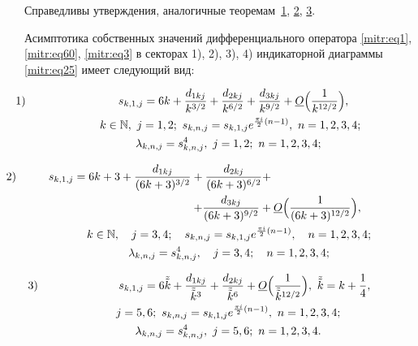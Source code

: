 Справедливы утверждения, аналогичные теоремам~\hyperlink{mitr:th1}{1}, \hyperlink{mitr:th2}{2}, \hyperlink{mitr:th3}{3}.



\smallskip



\begin{theorem}[4] Асимптотика собственных значений дифференциального оператора  {\rm \eqref{mitr:eq1}, \eqref{mitr:eq60}, \eqref{mitr:eq3}} в секторах  {\rm  1), 2), 3), 4)} индикаторной диаграммы \eqref{mitr:eq25} имеет следующий вид\/{\rm:}

\begin{gather}

\label{mitr:eq62}

\hskip-2.5cm 1)\hskip2.5cm \hfill s_{k,1,j}=6k+\frac{d_{1kj}}{k^{3/2}}+\frac{d_{2kj}}{k^{6/2}}+\frac{d_{3kj}}{k^{9/2}}+

\underline O\Bigl(\frac1{k^{12/2}}\Bigr),\hfill \\

 \ k\in\mathbb{N}, \ j=1,2; \  s_{k,n,j}=s_{k,1,j} e^{\frac{\pi i}2(n-1)}, \ n=1,2,3,4; \notag\\ 

\lambda_{k,n,j}=s^4_{k,n,j}, \ j=1,2; \ n=1,2,3,4;\notag

\end{gather}

\begin{gather}

\hskip-2.5cm 2)\hskip1cm s_{k,1,j}=6k+3+\frac{d_{1kj}}{(6k+3)^{3/2}}+\frac{d_{2kj}}{(6k+3)^{6/2}}+\hskip1.5cm \hfill \notag\\

\label{mitr:eq64}

\hskip3cm 

+\frac{d_{3kj}}{(6k+3)^{9/2}}+

\underline O\Bigl(\frac1{(6k+3)^{12/2}}\Bigr),\\ 

k\in\mathbb{N}, \quad j=3,4; \quad  s_{k,n,j}=s_{k,1,j} e^{\frac{\pi i}2(n-1)}, \quad n=1,2,3,4; \notag\\ 

\lambda_{k,n,j}=s^4_{k,n,j}, \quad j=3,4; \quad n=1,2,3,4;\notag

\end{gather}

\begin{gather}

\label{mitr:eq64}

\hskip-1.8cm 3)\hskip2.5cm

s_{k,1,j}=6\tilde {\tilde k}+\frac{d_{1kj}}{\tilde {\tilde k}^{3}}+\frac{d_{2kj}}{\tilde {\tilde k}^{6}}+

\underline O\Bigl(\frac1{\tilde {\tilde k}^{12/2}}\Bigr), \ \tilde {\tilde k}=k+\frac14,\hfill \\ j=5,6; \  s_{k,n,j}=s_{k,1,j} e^{\frac{\pi i}2(n-1)}, \ n=1,2,3,4; \notag\\ \lambda_{k,n,j}=s^4_{k,n,j}, \ j=5,6; \ n=1,2,3,4.\notag

\end{gather}

\end{theorem}




